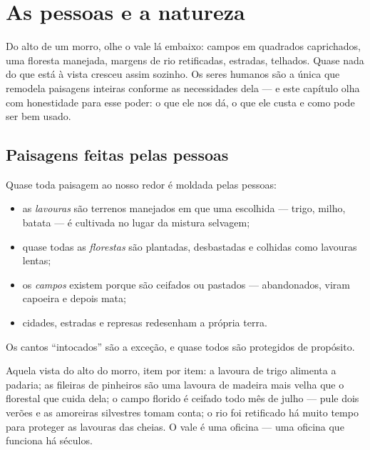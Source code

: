 \chapter{As pessoas e a natureza}\label{ch:g5:people-and-nature}

Do alto de um morro, olhe o vale lá embaixo: campos em quadrados
caprichados, uma floresta manejada, margens de rio retificadas,
estradas, telhados. Quase nada do que está à vista cresceu assim
sozinho. Os seres humanos são a única  que remodela paisagens
inteiras conforme as necessidades dela --- e este capítulo olha com
honestidade para esse poder: o que ele nos dá, o que ele custa e
como pode ser bem usado.

\section{Paisagens feitas pelas pessoas}

\begin{proposition}\label{prop:g5:people-and-nature:managed}
Quase toda paisagem ao nosso redor é moldada pelas pessoas:
\begin{itemize}
  \item as \emph{lavouras} são terrenos manejados em
        que uma  escolhida --- trigo, milho, batata --- é
        cultivada no lugar da mistura selvagem;
  \item quase todas as \emph{florestas}
        são plantadas, desbastadas e colhidas como lavouras lentas;
  \item os \emph{campos} existem porque são ceifados ou pastados ---
        abandonados, viram capoeira e depois mata;
  \item cidades, estradas e represas redesenham a própria terra.
\end{itemize}
Os cantos ``intocados'' são a exceção, e quase todos são protegidos
de propósito.
\end{proposition}
\admitted

\begin{example}\label{ex:g5:people-and-nature:valley}
Aquela vista do alto do morro, item por item: a lavoura de trigo
alimenta a padaria; as fileiras de pinheiros são uma lavoura de
madeira mais velha que o florestal que cuida dela; o campo florido é
ceifado todo mês de julho --- pule dois verões e as amoreiras
silvestres tomam conta; o rio foi retificado há muito tempo para
proteger as lavouras das cheias. O vale é uma oficina --- uma oficina
que funciona há séculos.
\end{example}

